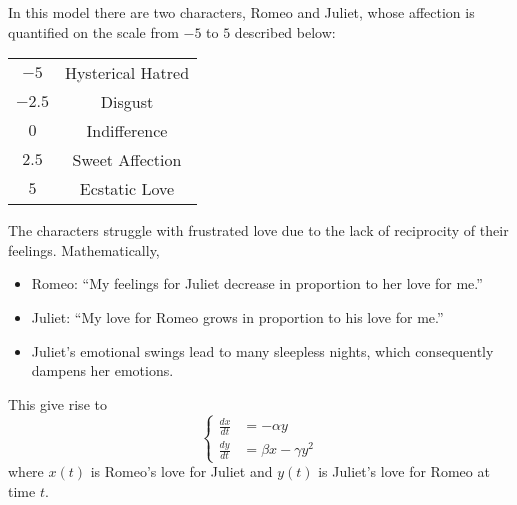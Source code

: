 \begin{problem}
    In this model there are two characters, Romeo and Juliet, whose affection is
    quantified on the scale from $-5$ to $5$ described below:
    \begin{center}
        \begin{tabular}{|c|c|}
            \hline
            $-5$ & Hysterical Hatred \\
            $-2.5$ & Disgust \\
            $0$ & Indifference \\
            $2.5$ & Sweet Affection \\
            $5$ & Ecstatic Love\\
            \hline
        \end{tabular}
    \end{center}
    The characters struggle with frustrated love due to the lack of reciprocity of their
    feelings.  Mathematically,
    \begin{itemize}
        \item Romeo: ``My feelings for Juliet decrease in proportion to her love for me.''
        \item Juliet: ``My love for Romeo grows in proportion to his love for me.''
        \item Juliet's emotional swings lead to many sleepless nights, which consequently
            dampens her emotions.
    \end{itemize}
    This give rise to
    \[ \left\{ \begin{array}{ll} \frac{dx}{dt} &= -\alpha y \\ \frac{dy}{dt} &= \beta x -
            \gamma y^2 \end{array} \right. \]
    where $x(t)$ is Romeo's love for Juliet and $y(t)$ is Juliet's love for Romeo at time
    $t$.


\end{problem}

